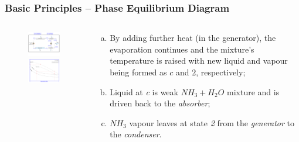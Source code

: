 \documentclass[10pt,compress]{beamer}
\begin{document}
\begin{frame}
 \frametitle{Basic Principles -- Phase Equilibrium Diagram} 
  \begin{columns}
   \begin{column}[c]{0.45\linewidth}
    \begin{figure}%
     \vbox{
      \includegraphics[width=4.5cm,height=4.cm,clip]{./Pics/Overview_Refrig32}
      \vspace{-.5cm}
      \includegraphics[width=4.5cm,height=4.cm,clip]{./Pics/Overview_Refrig34}}
    \end{figure}  
   \end{column}  
   \begin{column}[c]{0.55\linewidth}
    \begin{enumerate}[(a)]
     \item <1-> By adding further heat (in the generator), the evaporation continues and the mixture's temperature is raised with new liquid and vapour being formed as $c$ and $2$, respectively;
     \item <2-> Liquid at {\it c} is weak $NH_{3}+H_{2}O$ mixture and is driven back to the {\it absorber};
     \item <3-> $NH_{3}$ vapour leaves at state {\it 2} from the {\it generator} to the {\it condenser}.
   \end{enumerate}
  \end{column}  
 \end{columns}  
\end{frame}
\end{document}
